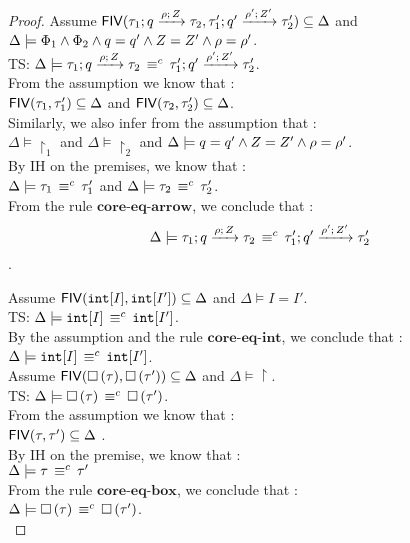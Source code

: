 \begin{proof}
  Assume $ \fiv{\tarr{\type_1}{\type_2}{\nnatbiA}{\dmap}{\nnatA} , \tarr{\type_1'}{\type_2'}{\nnatbiA'}{\dmap'}{\nnatA'}  } \subseteq \Delta $ and $\Delta \models \restriction_1 \land \restriction_2 \land \nnatbiA =\nnatbiA'
    \land \nnatA = \nnatA' \land \dmap = \dmap'  $.\\  
    TS: $\Delta \models \eqvc{\tarr{\type_1}{\type_2}{\nnatbiA}{\dmap}{\nnatA}}{\tarr{\type_1'}{\type_2'}{\nnatbiA'}{\dmap'}{\nnatA'}} $.\\
 From the assumption we know that :\\
 $ \fiv{\type_1, \type_1'} \subseteq \Delta $ and $ \fiv{\type_2, \type_2'} \subseteq \Delta $.\\
 Similarly, we also infer from the assumption that : \\
 $\Delta \models \restriction_1  $ and $\Delta \models \restriction_2 $ and $\Delta \models \nnatbiA =\nnatbiA'
    \land \nnatA = \nnatA' \land \dmap = \dmap' $. \\
 By IH on the premises, we know that : \\
 $\Delta \models \eqvc{\type_1}{\type_1'}$ and $\Delta \models \eqvc{\type_2}{\type_2'}$.\\
  From the rule $\textbf{core-eq-arrow}$, we conclude that : \\
  $$\Delta \models \eqvc{\tarr{\type_1}{\type_2}{\nnatbiA}{\dmap}{\nnatA}}{\tarr{\type_1'}{\type_2'}{\nnatbiA'}{\dmap'}{\nnatA'}} $$.\\
  

 Assume $ \fiv{\tint[I], \tint[I']} \subseteq \Delta $ and $\Delta \models I = I'  $.\\
  TS: $\Delta \models \eqvc{\tint[I]}{\tint[I']} $.\\
  By the assumption and the rule $\textbf{core-eq-int}$, we conclude that : \\
   $\Delta \models \eqvc{\tint[I]}{\tint[I']} $.\\


Assume $ \fiv{\tbox{\type}, \tbox{\type'}} \subseteq \Delta $ and $\Delta \models \restriction  $.\\
  TS: $\Delta \models \eqvc{\tbox{\type}}{\tbox{\type'}} $.\\
From the assumption we know that :\\
 $ \fiv{\type, \type'} \subseteq \Delta $ .\\
 By IH on the premise, we know that : \\
 $\Delta \models \eqvc{\type}{\type'}$ \\ 
From the rule $\textbf{core-eq-box}$, we conclude that : \\
 $\Delta \models \eqvc{\tbox{\type}}{\tbox{\type'}} $.\\
 

\end{proof}
